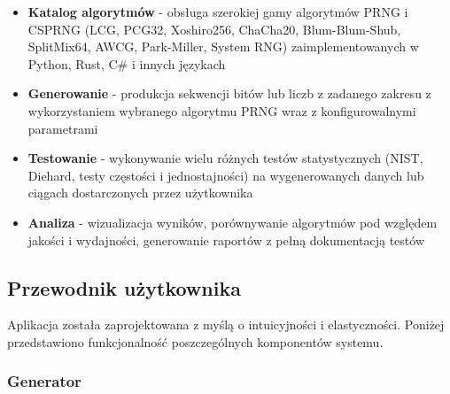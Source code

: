 \documentclass[12pt,a4paper]{article}
\begin{document}
\begin{itemize}
    \item \textbf{Katalog algorytmów} - obsługa szerokiej gamy algorytmów PRNG i CSPRNG (LCG, PCG32, Xoshiro256, ChaCha20, Blum-Blum-Shub, SplitMix64, AWCG, Park-Miller, System RNG) zaimplementowanych w Python, Rust, C\# i innych językach
    \item \textbf{Generowanie} - produkcja sekwencji bitów lub liczb z zadanego zakresu z wykorzystaniem wybranego algorytmu PRNG wraz z konfigurowalnymi parametrami
    \item \textbf{Testowanie} - wykonywanie wielu różnych testów statystycznych (NIST, Diehard, testy częstości i jednostajności) na wygenerowanych danych lub ciągach dostarczonych przez użytkownika
    \item \textbf{Analiza} - wizualizacja wyników, porównywanie algorytmów pod względem jakości i wydajności, generowanie raportów z pełną dokumentacją testów
\end{itemize}

\subsection{Przewodnik użytkownika}

Aplikacja została zaprojektowana z myślą o intuicyjności i elastyczności. Poniżej przedstawiono funkcjonalność poszczególnych komponentów systemu.

\subsubsection{Generator}
\end{document}
